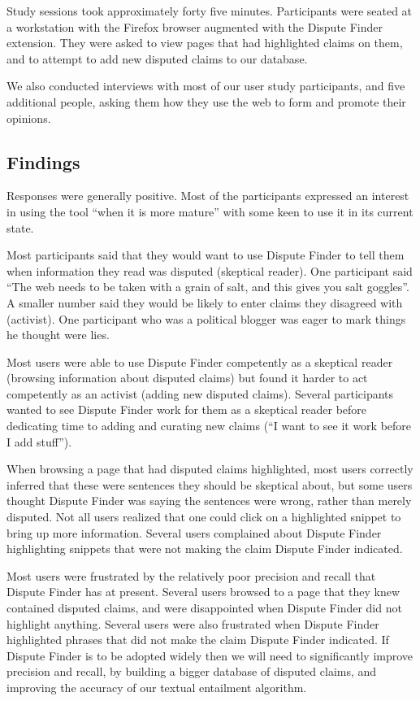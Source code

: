 \documentclass{www2010-submission}
\newcommand{\todo}[1]{}
\begin{document}
Study sessions took approximately forty five minutes. Participants were seated at a workstation with the Firefox browser augmented with the Dispute Finder extension. They were asked to view pages that had highlighted claims on them, and to attempt to add new disputed claims to our database.

We also conducted interviews with most of our user study participants, and five additional people, asking them how they use the web to form and promote their opinions.

\todo{Need to finish the third wave of user studies}

\subsection{Findings}

Responses were generally positive. Most of the participants expressed an interest in using the tool ``when it is more mature'' with some keen to use it in its current state.

\todo{Tye: say how many were keen to use the tool.}

Most participants said that they would want to use Dispute Finder to tell them when information they read was disputed (skeptical reader). One participant said ``The web needs to be taken with a grain of salt, and this gives you salt goggles''. A smaller number said they would be likely to enter claims they disagreed with (activist). One participant who was a political blogger was eager to mark things he thought were lies.

Most users were able to use Dispute Finder competently as a skeptical reader (browsing information about disputed claims) but found it harder to act competently as an activist (adding new disputed claims). Several participants wanted to see Dispute Finder work for them as a skeptical reader before dedicating time to adding and curating new claims (``I want to see it work before I add stuff'').

When browsing a page that had disputed claims highlighted, most users correctly inferred that these were sentences they should be skeptical about, but some users thought Dispute Finder was saying the sentences were wrong, rather than merely disputed. Not all users realized that one could click on a highlighted snippet to bring up more information. Several users complained about Dispute Finder highlighting snippets that were not making the claim Dispute Finder indicated.

Most users were frustrated by the relatively poor precision and recall that Dispute Finder has at present. Several users browsed to a page that they knew contained disputed claims, and were disappointed when Dispute Finder did not highlight anything. Several users were also frustrated when Dispute Finder highlighted phrases that did not make the claim Dispute Finder indicated. If Dispute Finder is to be adopted widely then we will need to significantly improve precision and recall, by building a bigger database of disputed claims, and improving the accuracy of our textual entailment algorithm.
\end{document}
